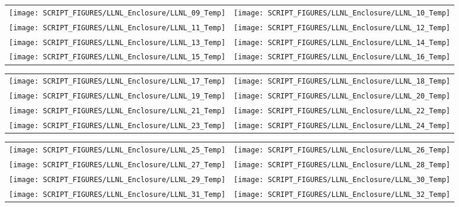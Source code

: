 \begin{figure}[!ht]
\begin{tabular*}{\textwidth}{l@{\extracolsep{\fill}}r}
\texttt{[image: SCRIPT\_FIGURES/LLNL\_Enclosure/LLNL\_09\_Temp]} &
\texttt{[image: SCRIPT\_FIGURES/LLNL\_Enclosure/LLNL\_10\_Temp]} \\
\texttt{[image: SCRIPT\_FIGURES/LLNL\_Enclosure/LLNL\_11\_Temp]} &
\texttt{[image: SCRIPT\_FIGURES/LLNL\_Enclosure/LLNL\_12\_Temp]} \\
\texttt{[image: SCRIPT\_FIGURES/LLNL\_Enclosure/LLNL\_13\_Temp]} &
\texttt{[image: SCRIPT\_FIGURES/LLNL\_Enclosure/LLNL\_14\_Temp]} \\
\texttt{[image: SCRIPT\_FIGURES/LLNL\_Enclosure/LLNL\_15\_Temp]} &
\texttt{[image: SCRIPT\_FIGURES/LLNL\_Enclosure/LLNL\_16\_Temp]}
\end{tabular*}
\label{LLNL_Enclosure_Temp_2}
\end{figure}

\begin{figure}[!ht]
\begin{tabular*}{\textwidth}{l@{\extracolsep{\fill}}r}
\texttt{[image: SCRIPT\_FIGURES/LLNL\_Enclosure/LLNL\_17\_Temp]} &
\texttt{[image: SCRIPT\_FIGURES/LLNL\_Enclosure/LLNL\_18\_Temp]} \\
\texttt{[image: SCRIPT\_FIGURES/LLNL\_Enclosure/LLNL\_19\_Temp]} &
\texttt{[image: SCRIPT\_FIGURES/LLNL\_Enclosure/LLNL\_20\_Temp]} \\
\texttt{[image: SCRIPT\_FIGURES/LLNL\_Enclosure/LLNL\_21\_Temp]} &
\texttt{[image: SCRIPT\_FIGURES/LLNL\_Enclosure/LLNL\_22\_Temp]} \\
\texttt{[image: SCRIPT\_FIGURES/LLNL\_Enclosure/LLNL\_23\_Temp]} &
\texttt{[image: SCRIPT\_FIGURES/LLNL\_Enclosure/LLNL\_24\_Temp]}
\end{tabular*}
\label{LLNL_Enclosure_Temp_3}
\end{figure}

\begin{figure}[!ht]
\begin{tabular*}{\textwidth}{l@{\extracolsep{\fill}}r}
\texttt{[image: SCRIPT\_FIGURES/LLNL\_Enclosure/LLNL\_25\_Temp]} &
\texttt{[image: SCRIPT\_FIGURES/LLNL\_Enclosure/LLNL\_26\_Temp]} \\
\texttt{[image: SCRIPT\_FIGURES/LLNL\_Enclosure/LLNL\_27\_Temp]} &
\texttt{[image: SCRIPT\_FIGURES/LLNL\_Enclosure/LLNL\_28\_Temp]} \\
\texttt{[image: SCRIPT\_FIGURES/LLNL\_Enclosure/LLNL\_29\_Temp]} &
\texttt{[image: SCRIPT\_FIGURES/LLNL\_Enclosure/LLNL\_30\_Temp]} \\
\texttt{[image: SCRIPT\_FIGURES/LLNL\_Enclosure/LLNL\_31\_Temp]} &
\texttt{[image: SCRIPT\_FIGURES/LLNL\_Enclosure/LLNL\_32\_Temp]}
\end{tabular*}
\label{LLNL_Enclosure_Temp_4}
\end{figure}


